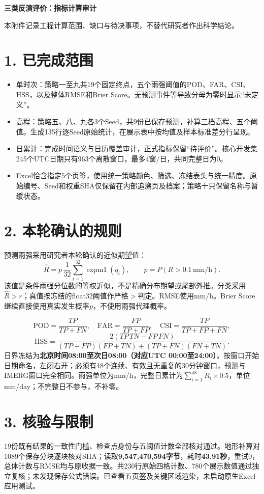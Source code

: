 \documentclass[UTF8,a4paper,10pt]{ctexart}
\begin{document}
{\LARGE\bfseries 三类反演评价：指标计算审计}\par
{\small 本附件记录工程计算范围、缺口与待决事项，不替代研究者作出科学结论。}

\section*{1. 已完成范围}
\begin{itemize}
\item 单时次：策略一至九共19个固定终点，五个雨强阈值的POD、FAR、CSI、HSS，以及整体RMSE和Brier Score。无预测事件等导致分母为零时显示“未定义”。
\item 高程：策略五、八、九各3个Seed，共9份已保存预测，补算三档高程、五个阈值。生成135行逐Seed原始统计，在展示表中按均值及样本标准差分行呈现。
\item 日累计：完成时间语义与日历覆盖审计，正式指标保留“待评价”。核心开发集245个UTC日期只有963个离散窗口，最多4窗/日，共同完整日为0。
\item Excel恰含指定5个页签，使用统一策略颜色、筛选、冻结表头与统一精度。原始编号、Seed和权重SHA仅保留在内部追溯页及档案；策略十只保留名称与暂缓状态。
\end{itemize}

\section*{2. 本轮确认的规则}
预测雨强采用研究者本轮确认的近似期望值：
\[
 \widehat R=p\,\frac{1}{32}\sum_{i=1}^{32}\operatorname{expm1}(q_i),
 \qquad p=P(R>0.1\,\mathrm{mm/h}).
\]
该值是条件雨强分位数的等权近似，不是精确分布期望或尾部外推。分类采用$\widehat R>r$；真值按冻结的float32阈值作严格$>$判定。RMSE使用mm/h。Brier Score继续直接使用真实发生概率$p$，不使用雨强代理概率。

\[
\mathrm{POD}=\frac{TP}{TP+FN},\quad
\mathrm{FAR}=\frac{FP}{TP+FP},\quad
\mathrm{CSI}=\frac{TP}{TP+FP+FN},
\]
\[
\mathrm{HSS}=\frac{2(TP\,TN-FP\,FN)}{(TP+FP)(FP+TN)+(TP+FN)(FN+TN)}.
\]
日界冻结为\textbf{北京时间08:00至次日08:00（对应UTC 00:00至24:00）}。按窗口开始日期命名，左闭右开；必须有48个连续、有效且无重复的30分钟窗口，预测与IMERG窗口完全相同。雨强单位为mm/h，完整日累计为$\sum_{i=1}^{48}R_i\times0.5$，单位mm/day；不完整日不参与，不补零。

\section*{3. 核验与限制}
19份既有结果的一致性门槛、检查点身份与五阈值计数全部核对通过。地形补算对1089个保存分块逐块核对SHA；读取\textbf{9,547,470,594字节}，耗时\textbf{43.91秒}，重试0，总体计数与RMSE均与原收据一致。共230行原始四格计数、780个展示数值通过独立复核；未发现保存公式错误。已查看五页签及关键区域渲染，未启动原生Excel应用测试。
\end{document}
